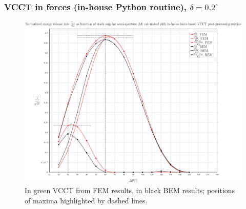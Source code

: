 \documentclass[first,firstsupp,lastsupp,handout,last,hyperref,table]{ETHclass}
\begin{document}
\begin{frame}
\frametitle{\small VCCT in forces (in-house Python routine), $\delta=0.2^{\circ}$}
\vspace{-0.5cm}
\centering
\captionsetup[figure]{font=scriptsize,labelfont=scriptsize}
\begin{figure}[!h]
\centering
\includegraphics[height=0.7\textheight]{2017-07-10_AbqRunSummary_SmallStrainD02_M-F-VCCT_Summary.pdf}
  \caption{\scriptsize In green VCCT from FEM results, in black BEM results; positions of maxima highlighted by dashed lines.}
  \label{fig:res1}
\end{figure}
\end{frame}
\end{document}
